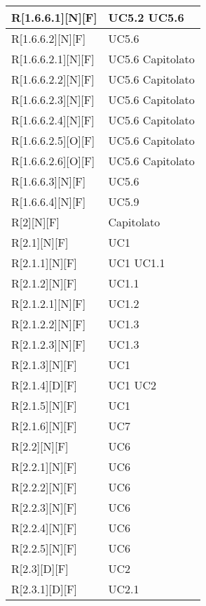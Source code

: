 \begin{longtable}{X | X}
\hline
R[1.6.6.1][N][F] & UC5.2 \newline UC5.6 \\
\hline
R[1.6.6.2][N][F] & UC5.6 \\
\hline
R[1.6.6.2.1][N][F] & UC5.6 \newline Capitolato \\
\hline
R[1.6.6.2.2][N][F] & UC5.6 \newline Capitolato \\
\hline
R[1.6.6.2.3][N][F] & UC5.6 \newline Capitolato \\
\hline
R[1.6.6.2.4][N][F] & UC5.6 \newline Capitolato \\
\hline
R[1.6.6.2.5][O][F] & UC5.6 \newline Capitolato \\
\hline
R[1.6.6.2.6][O][F] & UC5.6 \newline Capitolato \\
\hline
R[1.6.6.3][N][F] & UC5.6 \\
\hline
R[1.6.6.4][N][F] & UC5.9 \\
\hline
R[2][N][F] & Capitolato \\
\hline
R[2.1][N][F] & UC1 \\
\hline
R[2.1.1][N][F] & UC1 \newline UC1.1 \\
\hline
R[2.1.2][N][F] & UC1.1 \\
\hline
R[2.1.2.1][N][F] & UC1.2 \\
\hline
R[2.1.2.2][N][F] & UC1.3 \\
\hline
R[2.1.2.3][N][F] & UC1.3 \\
\hline
R[2.1.3][N][F] & UC1 \\
\hline
R[2.1.4][D][F] & UC1 \newline UC2 \\
\hline
R[2.1.5][N][F] & UC1 \\
\hline
R[2.1.6][N][F] & UC7 \\
\hline
R[2.2][N][F] & UC6 \\
\hline
R[2.2.1][N][F] & UC6 \\
\hline
R[2.2.2][N][F] & UC6 \\
\hline
R[2.2.3][N][F] & UC6 \\
\hline
R[2.2.4][N][F] & UC6 \\
\hline
R[2.2.5][N][F] & UC6 \\
\hline
R[2.3][D][F] & UC2 \\
\hline
R[2.3.1][D][F] & UC2.1 \\

\end{longtable}
